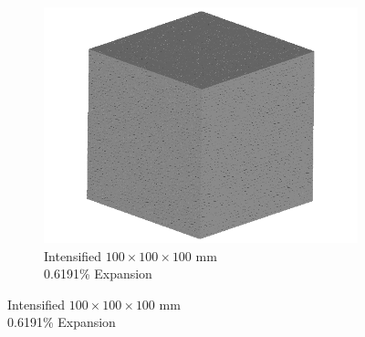 \begin{figure}[ht!]
\begin{subfigure}{.3\textwidth}
      \includegraphics[width=.9\linewidth]{Files/exp_3D/DEF/A30X-1C_3_3d.png}
    \caption{Intensified $100 \times 100 \times 100$ mm \\  0.6191\% Expansion}
    \end{subfigure}%


\end{figure}
